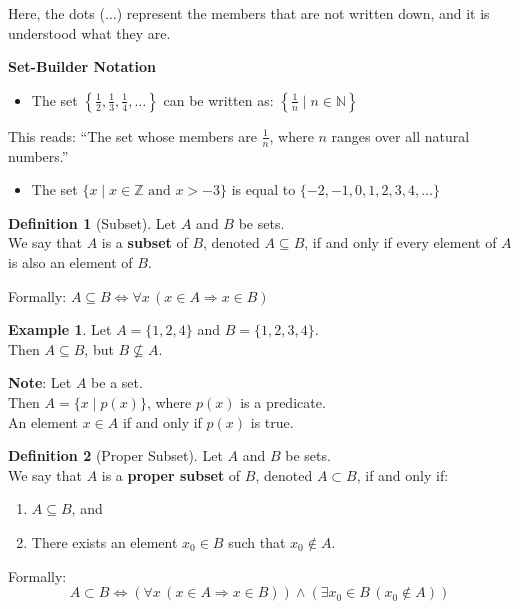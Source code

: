\documentclass[
]{book}
\providecommand{\tightlist}{%
  \setlength{\itemsep}{0pt}\setlength{\parskip}{0pt}}
\theoremstyle{definition}
\newtheorem{definition}{Definition}[chapter]
\theoremstyle{definition}
\newtheorem{example}{Example}[chapter]
\theoremstyle{definition}
\theoremstyle{definition}
\theoremstyle{remark}
\begin{document}
Here, the dots (\(\dots\)) represent the members that are not written down, and it is understood what they are.

\textbf{Set-Builder Notation}

\begin{itemize}
\tightlist
\item
  The set \(\left\{ \frac{1}{2}, \frac{1}{3}, \frac{1}{4}, \dots \right\}\) can be written as: \(\left\{ \frac{1}{n} \mid n \in \mathbb{N} \right\}\)
\end{itemize}

This reads: ``The set whose members are \(\frac{1}{n}\), where \(n\) ranges over all natural numbers.''

\begin{itemize}
\tightlist
\item
  The set \(\{x \mid x \in \mathbb{Z} \text{ and } x > -3\}\) is equal to \(\{-2, -1, 0, 1, 2, 3, 4, \dots\}\)
\end{itemize}

\begin{definition}[Subset]
\protect\hypertarget{def:unnamed-chunk-122}{}\label{def:unnamed-chunk-122}Let \(A\) and \(B\) be sets.\\
We say that \(A\) is a \textbf{subset} of \(B\), denoted \(A \subseteq B\), if and only if every element of \(A\) is also an element of \(B\).

Formally: \(A \subseteq B \iff \forall x \, (x \in A \Rightarrow x \in B)\)
\end{definition}

\begin{example}
\protect\hypertarget{exm:unnamed-chunk-123}{}\label{exm:unnamed-chunk-123}Let \(A = \{1, 2, 4\}\) and \(B = \{1, 2, 3, 4\}\).\\
Then \(A \subseteq B\), but \(B \nsubseteq A\).
\end{example}

\textbf{Note}:
Let \(A\) be a set.\\
Then \(A = \{x \mid p(x)\}\), where \(p(x)\) is a predicate.\\
An element \(x \in A\) if and only if \(p(x)\) is true.

\begin{definition}[Proper Subset]
\protect\hypertarget{def:unnamed-chunk-124}{}\label{def:unnamed-chunk-124}Let \(A\) and \(B\) be sets.\\
We say that \(A\) is a \textbf{proper subset} of \(B\), denoted \(A \subset B\), if and only if:

\begin{enumerate}
\def\labelenumi{\arabic{enumi}.}
\tightlist
\item
  \(A \subseteq B\), and\\
\item
  There exists an element \(x_0 \in B\) such that \(x_0 \notin A\).
\end{enumerate}

Formally:
\[
A \subset B \iff \left( \forall x \, (x \in A \Rightarrow x \in B) \right) \land \left( \exists x_0 \in B \, (x_0 \notin A) \right)
\]
\end{definition}
\end{document}
